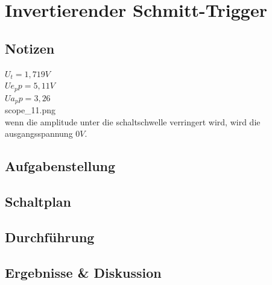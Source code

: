 \documentclass[12pt,a4paper,titlepage]{article}
\begin{document}
\section{Invertierender Schmitt-Trigger}

\subsection*{Notizen}
$U_t = 1,719V$\\
$Ue_pp = 5,11V$\\
$Ua_pp = 3,26$\\
scope\_11.png \\
wenn die amplitude unter die schaltschwelle verringert wird, wird die ausgangsspannung $0V$.
\subsection*{Aufgabenstellung}

\subsection*{Schaltplan}

\subsection*{Durchf\"uhrung}

\subsection*{Ergebnisse \& Diskussion}
\end{document}
